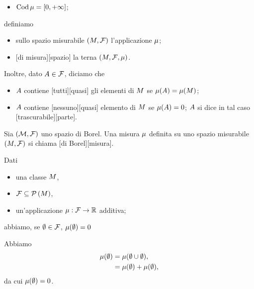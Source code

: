 \begin{Definition}
\begin{itemize}
    \item $\operatorname{Cod}{\mu} = [0,+\infty]$;
  \end{itemize}
  definiamo
  \begin{itemize}
    \item {} sullo spazio misurabile
      $(M,\mathcal{F})$
      l'applicazione $\mu$;
    \item {}[di misura][spazio] la terna
      $(M,\mathcal{F},\mu)$.
  \end{itemize}
  Inoltre, dato $A \in \mathcal{F}$, diciamo che
  \begin{itemize}
    \item $A$ contiene [tutti][quasi]
      gli elementi di $M$ se
      $\mu(A) = \mu(M)$;
    \item $A$ contiene [nessuno][quasi]
      elemento di $M$ se
      $\mu(A) = 0$; $A$ si dice in tal caso
      [trascurabile][parte].
  \end{itemize}
\end{Definition}
\begin{Definition}
  Sia $(\mathcal{M},\mathcal{F})$ uno spazio di Borel. Una misura
  $\mu$ definita su uno spazio misurabile $(M,\mathcal{F})$
  si chiama
  [di Borel][misura].
\end{Definition}
\begin{Theorem}
  Dati
  \begin{itemize}
    \item una classe $M$,
    \item $\mathcal{F}  \subseteq \mathcal{P} \left (M \right )$,
    \item un'applicazione
          $\mu: \mathcal{F} \rightarrow \mathbb{R}$
          additiva;
  \end{itemize}
  abbiamo, se $\emptyset \in \mathcal{F}$,
  $\mu(\emptyset) = 0$
\end{Theorem}
\Proof Abbiamo
\begin{align*}
  \mu(\emptyset)
  &= \mu(\emptyset \cup \emptyset),\\
  &= \mu(\emptyset) + \mu(\emptyset),
\end{align*}
da cui $\mu(\emptyset) = 0$. \EndProof
